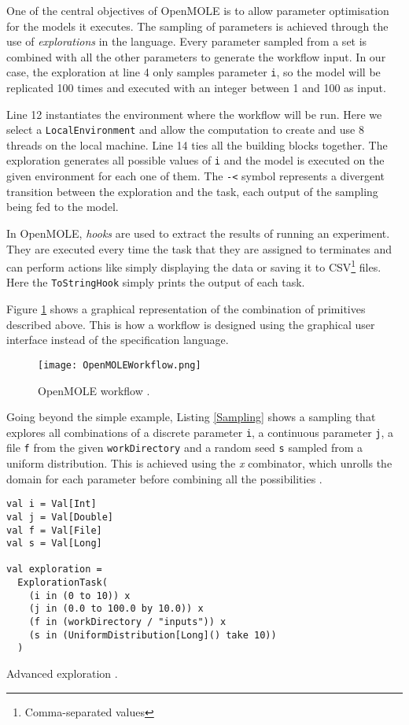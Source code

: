 One of the central objectives of OpenMOLE is to allow parameter optimisation for the models it executes. The sampling of parameters is achieved through the use of \textit{explorations} in the language. Every parameter sampled from a set is combined with all the other parameters to generate the workflow input. In our case, the exploration at line 4 only samples parameter \verb|i|, so the model will be replicated 100 times and executed with an integer between 1 and 100 as input.


Line 12 instantiates the environment where the workflow will be run. Here we select a \verb|LocalEnvironment| and allow the computation to create and use 8 threads on the local machine. Line 14 ties all the building blocks together. The exploration generates all possible values of \verb|i| and the model is executed on the given environment for each one of them. The \verb|-<| symbol represents a divergent transition between the exploration and the task, each output of the sampling being fed to the model.

In OpenMOLE, \textit{hooks} are used to extract the results of running an experiment. They are executed every time the task that they are assigned to terminates and can perform actions like simply displaying the data or saving it to CSV\footnote{Comma-separated values} files. Here the \verb|ToStringHook| simply prints the output of each task.

Figure \ref{OpenMOLEWorkflow} shows a graphical representation of the combination of primitives described above. This is how a workflow is designed using the graphical user interface instead of the specification language.

\begin{figure}[h]
	\centering
		\texttt{[image: OpenMOLEWorkflow.png]}
	\caption{OpenMOLE workflow \cite{OpenMOLE}.}
	\label{OpenMOLEWorkflow}
\end{figure}

Going beyond the simple example, Listing \ref{Sampling} shows a sampling that explores all combinations of a discrete parameter \verb|i|, a continuous parameter \verb|j|, a file \verb|f| from the given \verb|workDirectory| and a random seed \verb|s| sampled from a uniform distribution. This is achieved using the \textit{x} combinator, which unrolls the domain for each parameter before combining all the possibilities \cite{OpenMOLEDSL}.

\begin{listing}[h]
	\centering
	\begin{minipage}{10.6cm}
		\begin{verbatim}
val i = Val[Int]
val j = Val[Double]
val f = Val[File]
val s = Val[Long]

val exploration = 
  ExplorationTask(
	(i in (0 to 10)) x 
	(j in (0.0 to 100.0 by 10.0)) x
	(f in (workDirectory / "inputs")) x 
	(s in (UniformDistribution[Long]() take 10))
  )
		\end{verbatim}
	\end{minipage}
	\caption{Advanced exploration \cite{Leclaire2016}.}
	\label{Sampling}
\end{listing}

